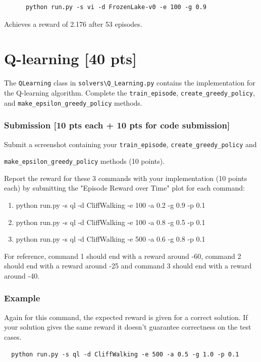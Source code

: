 \documentclass[a4paper]{article}
\theoremstyle{definition}
\begin{document}
\begin{verbatim}
      python run.py -s vi -d FrozenLake-v0 -e 100 -g 0.9  
\end{verbatim}
Achieves a reward of 2.176 after 53 episodes.

\section{Q-learning [40 pts]}

The \verb|QLearning| class in \verb|solvers\Q_Learning.py| contains the implementation for the Q-learning algorithm. Complete the \verb|train_episode|, \verb|create_greedy_policy|,  and \verb|make_epsilon_greedy_policy| methods.

\subsubsection*{Submission [10 pts each + 10 pts for code submission]}

Submit a screenshot containing your \verb|train_episode|, \verb|create_greedy_policy| and 

\verb|make_epsilon_greedy_policy| methods (10 points). 

Report the reward for these 3 commands with your implementation (10 points each) by submitting the "Episode Reward over Time" plot for each command:

\begin{enumerate}
    \item  python run.py -s ql -d CliffWalking -e 100 -a 0.2 -g 0.9 -p 0.1
    \item  python run.py -s ql -d CliffWalking -e 100 -a 0.8 -g 0.5 -p 0.1  
    \item  python run.py -s ql -d CliffWalking -e 500 -a 0.6 -g 0.8 -p 0.1   
\end{enumerate}

For reference, command 1 should end with a reward around -60, command 2 should end with a reward around -25 and command 3 should end with a reward around -40.

\subsubsection*{Example}

Again for this command, the expected reward is given for a correct solution. If your solution gives the same reward it doesn't guarantee correctness on the test cases.

\begin{verbatim}
  python run.py -s ql -d CliffWalking -e 500 -a 0.5 -g 1.0 -p 0.1  
\end{verbatim}
\end{document}

